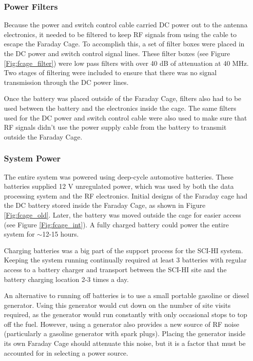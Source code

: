 \subsubsection{Power Filters}
Because the power and switch control cable carried DC power out to the antenna electronics, it needed to be filtered to keep RF signals from using the cable to escape the Faraday Cage. To accomplish this, a set of filter boxes were placed in the DC power and switch control signal lines. These filter boxes (see Figure \ref{Fig:fcage_filter}) were low pass filters with over 40 dB of attenuation at 40 MHz. Two stages of filtering were included to ensure that there was no signal transmission through the DC power lines. 

Once the battery was placed outside of the Faraday Cage, filters also had to be used between the battery and the electronics inside the cage. The same filters used for the DC power and switch control cable were also used to make sure that RF signals didn't use the power supply cable from the battery to transmit outside the Faraday Cage.  


\subsubsection{System Power} \label{Sec:sys_power}
The entire system was powered using deep-cycle automotive batteries. These batteries supplied 12 V unregulated power, which was used by both the data processing system and the RF electronics. Initial designs of the Faraday cage had the DC battery stored inside the Faraday Cage, as shown in Figure \ref{Fig:fcage_old}. Later, the battery was moved outside the cage for easier access (see Figure \ref{Fig:fcage_int}). A fully charged battery could power the entire system for $\sim$12-15 hours. 

Charging batteries was a big part of the support process for the SCI-HI system. Keeping the system running continually required at least 3 batteries with regular access to a battery charger and transport between the SCI-HI site and the battery charging location 2-3 times a day. 

An alternative to running off batteries is to use a small portable gasoline or diesel generator. Using this generator would cut down on the number of site visits required, as the generator would run constantly with only occasional stops to top off the fuel. However, using a generator also provides a new source of RF noise (particularly a gasoline generator with spark plugs). Placing the generator inside its own Faraday Cage should attenuate this noise, but it is a factor that must be accounted for in selecting a power source. 

